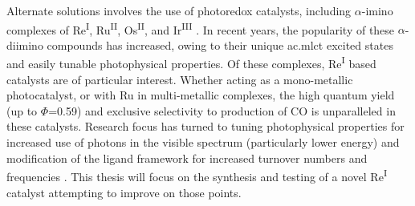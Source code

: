Alternate solutions involves the use of photoredox catalysts, including $\alpha$-imino complexes of Re\textsuperscript{I}, Ru\textsuperscript{II}, Os\textsuperscript{II}, and Ir\textsuperscript{III}  \autocite{hawecker1983, schneider2011, ishida1987, maidan1986, ishida1990, kitamura1983, tanaka2002, doherty2009, doherty2010, tamaki2013, shunsuke2013, reithmeier2014}. In recent years, the popularity of these $\alpha$-diimino compounds has increased, owing to their unique \gls{ac.mlct} excited states and easily tunable photophysical properties. Of these complexes, Re\textsuperscript{I} based catalysts are of particular interest. Whether acting as a mono-metallic photocatalyst, or with Ru in multi-metallic complexes, the high quantum yield (up to $\Phi$=0.59)\autocite{takeda2008} and exclusive selectivity to production of CO is unparalleled in these catalysts\autocite{grills2010}. Research focus has turned to tuning photophysical properties for increased use of photons in the visible spectrum (particularly lower energy) and modification of the ligand framework for increased turnover numbers and frequencies \autocite{grills2010, morris2009, kutal1985}. This thesis will focus on the synthesis and testing of a novel Re\textsuperscript{I} catalyst attempting to improve on those points.
